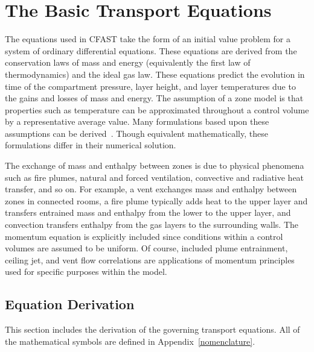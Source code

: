 \documentclass[12pt]{book}
\begin{document}
\chapter{The Basic Transport Equations}
\label{sec:Theory_Chapter}

The equations used in CFAST take the form of an initial value problem for a system of ordinary differential equations. These equations are derived from the conservation laws of mass and energy (equivalently the first law of thermodynamics) and the ideal gas law. These equations predict the evolution in time of the compartment pressure, layer height, and layer temperatures due to the gains and losses of mass and energy. The assumption of a zone model is that properties such as temperature can be approximated throughout a control volume by a representative average value. Many formulations based upon these assumptions can be derived~\cite{Forney:1994}. Though equivalent mathematically, these formulations differ in their numerical solution.

The exchange of mass and enthalpy between zones is due to physical phenomena such as fire plumes, natural and forced ventilation, convective and radiative heat transfer, and so on. For example, a vent exchanges mass and enthalpy between zones in connected rooms, a fire plume typically adds heat to the upper layer and transfers entrained mass and enthalpy from the lower to the upper layer, and convection transfers enthalpy from the gas layers to the surrounding walls. The momentum equation is explicitly included since conditions within a control volumes are assumed to be uniform. Of course, included plume entrainment, ceiling jet, and vent flow correlations are applications of momentum principles used for specific purposes within the model.

\section{Equation Derivation}

This section includes the derivation of the governing transport equations. All of the mathematical symbols are defined in Appendix~\ref{nomenclature}.
\end{document}

